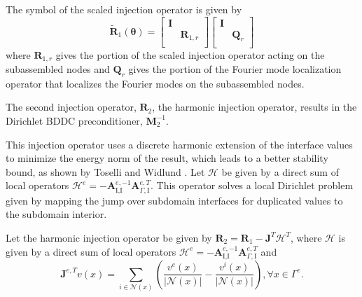 \documentclass[review]{siamart190516}
\begin{document}
\begin{definition}
The symbol of the scaled injection operator is given by
\begin{equation}
\tilde{\mathbf{R}}_1 \left( \boldsymbol{\theta} \right) =
\begin{bmatrix}
\mathbf{I} &                    \\
           & \mathbf{R}_{1, r}  \\
\end{bmatrix}
\begin{bmatrix}
\mathbf{I} &                 \\
           & \mathbf{Q}_{r}  \\
\end{bmatrix}
\end{equation}
where $\mathbf{R}_{1, r}$ gives the portion of the scaled injection operator acting on the subassembled nodes and $\mathbf{Q}_r$ gives the portion of the Fourier mode localization operator that localizes the Fourier modes on the subassembled nodes.
\label{def:scaled_injection_symbol}
\end{definition}

The second injection operator, $\mathbf{R}_2$, the harmonic injection operator, results in the Dirichlet BDDC preconditioner, $\mathbf{M}^{-1}_2$.

This injection operator uses a discrete harmonic extension of the interface values to minimize the energy norm of the result, which leads to a better stability bound, as shown by Toselli and Widlund \cite{toselli2006domain}.
Let $\boldsymbol{\mathcal{H}}$ be given by a direct sum of local operators $\boldsymbol{\mathcal{H}}^e = - \mathbf{A}_{\text{I}, \text{I}}^{e, -1} \mathbf{A}_{\Gamma, \text{I}}^{e, T}$.
This operator solves a local Dirichlet problem given by mapping the jump over subdomain interfaces for duplicated values to the subdomain interior.

\begin{definition}
Let the harmonic injection operator be given by $\mathbf{R}_2 = \mathbf{R}_1 - \mathbf{J}^T \boldsymbol{\mathcal{H}}^T$, where $\boldsymbol{\mathcal{H}}$ is given by a direct sum of local operators $\boldsymbol{\mathcal{H}}^e = - \mathbf{A}_{\text{I}, \text{I}}^{e, -1} \mathbf{A}_{\Gamma, \text{I}}^{e, T}$ and
\begin{equation}
\mathbf{J}^{e, T} v \left( x \right) = \sum_{i \in \mathcal{N} \left( x \right)} \left( \frac{v^e \left( x \right)}{\lvert \mathcal{N} \left( x \right) \rvert} - \frac{v^i \left( x \right)}{\lvert \mathcal{N} \left( x \right) \rvert} \right), \forall x \in \Gamma^e.
\end{equation}
\label{def:harmonicinjection}
\end{definition}
\end{document}
